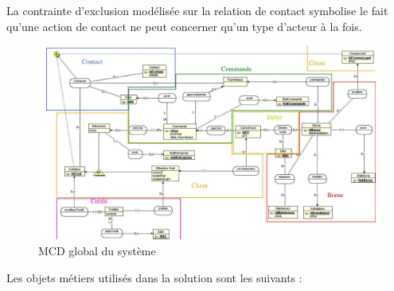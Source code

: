 La contrainte d'exclusion modélisée sur la relation de contact symbolise le
fait qu'une action de contact ne peut concerner qu'un type d'acteur à la fois. \\

\begin{landscape}
  \begin{figure}[ht]
      \centering
      \includegraphics[width=0.7\paperheight]{mcd}
      \caption{MCD global du système}
      \label{fig:mcd}
  \end{figure}
\end{landscape}

Les objets métiers utilisés dans la solution sont les suivants : \\

